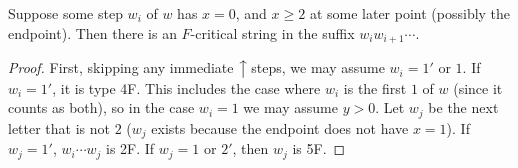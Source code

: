 \documentclass[ALCO,ThmDefs,Unicode,epreuves]{cedram}
\newcommand{\north}[1]{\ensuremath{\big \uparrow \!\text{\raisebox{.1ex}{\scriptsize $#1$}}}}
\begin{document}
\begin{lemma} \label{lem:xgeq2-Fcritical}
Suppose some step $w_i$ of $w$ has $x=0$, and $x \geq 2$ at some later point \textup{(}possibly the endpoint\textup{)}. Then there is an $F$-critical string in the suffix $w_i w_{i+1} \cdots$.
\end{lemma}

\begin{proof}%
First, skipping any immediate $\north{}$ steps, we may assume $w_i = 1'$ or $1$. If $w_i = 1'$, it is type 4F. This includes the case where $w_i$ is the first $1$ of $w$ (since it counts as both), so in the case $w_i = 1$ we may assume $y>0$. Let $w_j$ be the next letter that is not $2$ ($w_j$ exists because the endpoint does not have $x=1$). If $w_j = 1'$, $w_i \cdots w_j$ is 2F. If $w_j = 1$ or $2'$, then $w_j$ is 5F.
\end{proof}
\end{document}
